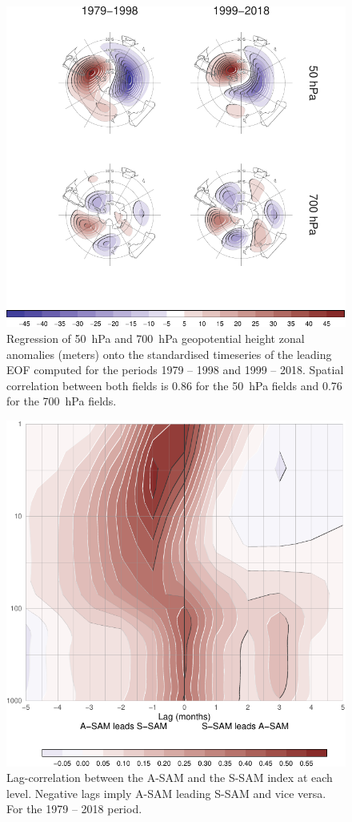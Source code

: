 \documentclass[smallextended]{svjour3}       %
\begin{document}
\begin{figure}
\includegraphics{A6-1} \caption{Regression of 50~hPa and 700~hPa geopotential height zonal anomalies (meters) onto the standardised timeseries of the leading EOF computed for the periods 1979 -- 1998 and 1999 -- 2018. Spatial correlation between both fields is 0.86 for the 50~hPa fields and 0.76 for the 700~hPa fields.}\label{fig:A6}
\end{figure}

\begin{figure}[ht]
\includegraphics{A1-1} \caption{Lag-correlation between the A\nobreakdash-SAM and the S\nobreakdash-SAM index at each level. Negative lags imply A\nobreakdash-SAM leading S\nobreakdash-SAM and vice versa. For the 1979 -- 2018 period.}\label{fig:A1}
\end{figure}
\end{document}
